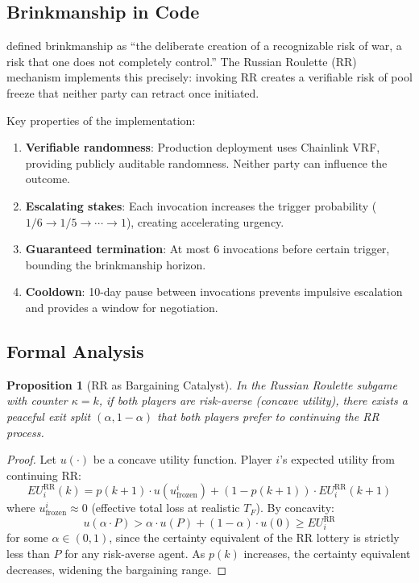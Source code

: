 \documentclass[12pt,a4paper]{article}
\newtheorem{proposition}{Proposition}
\begin{document}
\subsection{Brinkmanship in Code}

\citet{schelling1960} defined brinkmanship as ``the deliberate creation of a recognizable risk of war, a risk that one does not completely control.'' The Russian Roulette (RR) mechanism implements this precisely: invoking RR creates a verifiable risk of pool freeze that neither party can retract once initiated.

Key properties of the implementation:
\begin{enumerate}
\item \textbf{Verifiable randomness}: Production deployment uses Chainlink VRF, providing publicly auditable randomness. Neither party can influence the outcome.
\item \textbf{Escalating stakes}: Each invocation increases the trigger probability ($1/6 \to 1/5 \to \cdots \to 1$), creating accelerating urgency.
\item \textbf{Guaranteed termination}: At most 6 invocations before certain trigger, bounding the brinkmanship horizon.
\item \textbf{Cooldown}: 10-day pause between invocations prevents impulsive escalation and provides a window for negotiation.
\end{enumerate}

\subsection{Formal Analysis}

\begin{proposition}[RR as Bargaining Catalyst]
\label{prop:rr-bargain}
In the Russian Roulette subgame with counter $\kappa = k$, if both players are risk-averse (concave utility), there exists a peaceful exit split $(\alpha, 1-\alpha)$ that both players prefer to continuing the RR process.
\end{proposition}

\begin{proof}
Let $u(\cdot)$ be a concave utility function. Player $i$'s expected utility from continuing RR:
\[
EU_i^{\text{RR}}(k) = p(k+1) \cdot u(u_{\text{frozen}}^i) + (1-p(k+1)) \cdot EU_i^{\text{RR}}(k+1)
\]
where $u_{\text{frozen}}^i \approx 0$ (effective total loss at realistic $T_F$). By concavity:
\[
u(\alpha \cdot P) > \alpha \cdot u(P) + (1-\alpha) \cdot u(0) \geq EU_i^{\text{RR}}
\]
for some $\alpha \in (0,1)$, since the certainty equivalent of the RR lottery is strictly less than $P$ for any risk-averse agent. As $p(k)$ increases, the certainty equivalent decreases, widening the bargaining range.
\end{proof}
\end{document}
